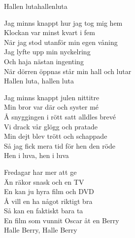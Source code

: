 \begin{song}{Hallen luta}{hallenluta}
\begin{vers}
Jag minns knappt hur jag tog mig hem\\
Klockan var minst kvart i fem\\
När jag stod utanför min egen våning\\
Jag lyfte upp min nyckelring\\
Och haja nästan ingenting\\
När dörren öppnas står min hall och lutar\\
\repopen Hallen luta, hallen luta \repclose\\
\end{vers}
\begin{vers}
Jag minns knappt julen nittitre\\
Min bror var där och syster mé\\
Å snyggingen i rött satt alldles brevé\\
Vi drack vår glögg och pratade\\
Min dejt blev trött och schappade\\
Så jag fick mera tid för hen den röde\\
\repopen Hen i luva, hen i luva \repclose\\
\end{vers}
\begin{vers}
Fredagar har mer att ge\\
Än räkor snask och en TV\\
En kan ju hyra film och DVD\\
Å vill en ha något riktigt bra\\
Så kan en faktiskt bara ta\\
En film som vunnit Oscar åt en Berry\\
\repopen Halle Berry, Halle Berry \repclose\\
\end{vers}
\end{song}
